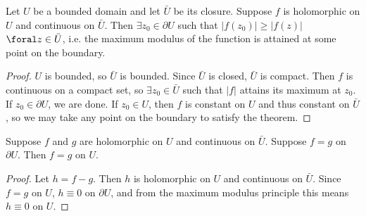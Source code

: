 \begin{theorem}
Let $U$ be a bounded domain and let $\bar{U}$ be its closure.
Suppose $f$ is holomorphic on $U$ and continuous on $\bar{U}$.
Then $\exists z_0 \in \partial U$ such that $|f(z_0)| \geq |f(z)|$
$\foral z \in \bar{U}$, i.e. the maximum modulus of the function is
attained at some point on the boundary.
\end{theorem}

\begin{proof}
$U$ is bounded, so $\bar{U}$ is bounded. Since $\bar{U}$ is closed,
$\bar{U}$ is compact. Then $f$ is continuous on a compact set, so
$\exists z_0 \in \bar{U}$ such that $|f|$ attains its maximum at
$z_0$. If $z_0 \in \partial U$, we are done. If $z_0 \in U$, then
$f$ is constant on $U$ and thus constant on $\bar{U}$, so we may
take any point on the boundary to satisfy the theorem.
\end{proof}

\begin{corol}
Suppose $f$ and $g$ are holomorphic on $U$ and continuous on $\bar{U}$.
Suppose $f = g$ on $\partial U$. Then $f = g$ on $U$.
\end{corol}

\begin{proof}
Let $h = f - g$. Then $h$ is holomorphic on $U$ and continuous on
$\bar{U}$. Since $f = g$ on $U$, $h \equiv 0$ on $\partial U$, and from
the maximum modulus principle this means $h \equiv 0$ on $U$.
\end{proof}
